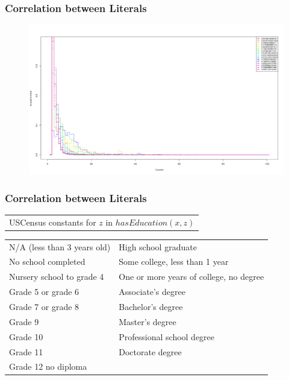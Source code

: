 \documentclass{beamer}
\begin{document}
\begin{frame}
\frametitle{Correlation between Literals}
  \begin{figure}
  \includegraphics[width=1\linewidth]{./Figures/income-education.png}
  \end{figure}
\end{frame}

\begin{frame}
\frametitle{Correlation between Literals}
  \begin{table} 
    \begin{tabular}{c}
      USCensus constants for $z$ in $hasEducation(x,z)$\\
     \end{tabular}
     \begin{tabular}{l  l}
      \midrule
      N/A (less than 3 years old)	& High school graduate	\\
      No school completed		& Some college, less than 1 year\\
      Nursery school to grade 4   	& One or more years of college, no degree\\
      Grade 5 or grade 6		& Associate's degree\\
      Grade 7 or grade 8		& Bachelor's degree\\
      Grade 9				& Master's degree\\
      Grade 10                   	& Professional school degree\\
      Grade 11				& Doctorate degree\\  
      Grade 12 no diploma   		& \\
    \end{tabular}
  \end{table}
\end{frame}
\end{document}
